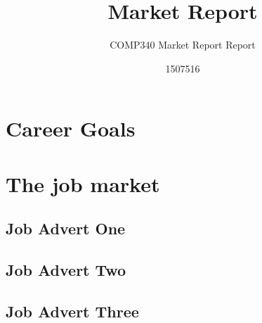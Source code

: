 \documentclass{scrartcl}
\title{Market Report}
\subtitle{COMP340 Market Report Report}
\author{1507516}
\begin{document}
\maketitle


\section{Career Goals}


\section{The job market}

\subsection{Job Advert One}

\subsection{Job Advert Two}

\subsection{Job Advert Three}





%
\end{document}
